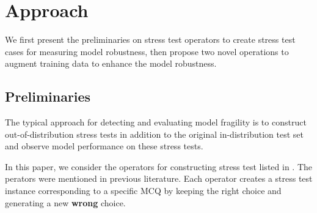 \section{Approach}

We first present the preliminaries on stress test operators to create stress 
test cases for measuring model robustness,
then propose two novel operations to augment training data to 
enhance the model robustness.

\subsection{Preliminaries}
 \label{sec:stressop}
The typical approach for detecting and evaluating model fragility is to construct out-of-distribution stress tests in addition to the original in-distribution test set and observe model performance on these stress tests.

In this paper, we consider the operators for constructing stress test listed in . 
The perators were mentioned in previous literature\cite{checklist2020acl}. 
Each operator creates a stress test instance corresponding to a specific MCQ by keeping the right choice and 
generating a new \textbf{wrong} choice. 

